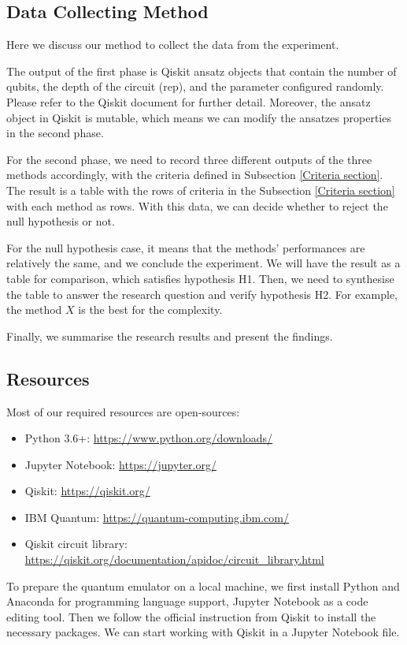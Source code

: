 \subsection{Data Collecting Method}
\label{Data Collecting Section}
Here we discuss our method to collect the data from the experiment.

The output of the first phase is Qiskit ansatz objects that contain the number of qubits, the depth of the circuit (rep), and the parameter configured randomly. Please refer to the Qiskit document for further detail.
Moreover, the ansatz object in Qiskit is mutable, which means we can modify the ansatzes properties in the second phase.

For the second phase, we need to record three different outputs of the three methods accordingly, with the criteria defined in Subsection \ref{Criteria section}.
The result is a table with the rows of criteria in the Subsection \ref{Criteria section} with each method as rows.
With this data, we can decide whether to reject the null hypothesis or not.

For the null hypothesis case, it means that the methods' performances are relatively the same, and we conclude the experiment.
We will have the result as a table for comparison, which satisfies hypothesis H1. 
Then, we need to synthesise the table to answer the research question and verify hypothesis H2. 
For example, the method $X$ is the best for the complexity.

Finally, we summarise the research results and present the findings.

\subsection{Resources}
Most of our required resources are open-sources:
\begin{itemize}
    \item Python 3.6+: \url{https://www.python.org/downloads/}
    \item Jupyter Notebook: \url{https://jupyter.org/}
    \item Qiskit: \url{https://qiskit.org/}
    \item IBM Quantum: \url{https://quantum-computing.ibm.com/}
    \item Qiskit circuit library: \url{https://qiskit.org/documentation/apidoc/circuit_library.html}
\end{itemize}

To prepare the quantum emulator on a local machine, we first install Python and Anaconda for programming language support, Jupyter Notebook as a code editing tool.
Then we follow the official instruction from Qiskit \cite{Qiskit} to install the necessary packages.
We can start working with Qiskit in a Jupyter Notebook file.

